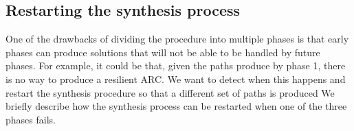 \subsection{Restarting the synthesis process}
One of the drawbacks of dividing the procedure into multiple phases is that
early phases can produce solutions that will not be able to be handled by future phases.
For example, it could be that, given the paths produce by phase 1, there is no way
to produce a resilient ARC. We want to detect when this happens and restart the synthesis procedure
so that a different set of paths is produced
We briefly describe how the synthesis process can be restarted
when one of the three phases fails.

